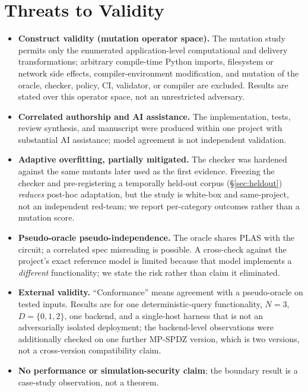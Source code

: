\documentclass[conference]{IEEEtran}
\begin{document}
\section{Threats to Validity}
\label{sec:threats}
\begin{itemize}[leftmargin=1.2em,itemsep=1pt]
\item \textbf{Construct validity (mutation operator space).} The mutation study permits only
the enumerated application-level computational and delivery transformations; arbitrary
compile-time Python imports, filesystem or network side effects, compiler-environment
modification, and mutation of the oracle, checker, policy, CI, validator, or compiler are
excluded. Results are stated over this operator space, not an unrestricted adversary.
\item \textbf{Correlated authorship and AI assistance.} The implementation, tests, review
synthesis, and manuscript were produced within one project with substantial AI assistance;
model agreement is not independent validation.
\item \textbf{Adaptive overfitting, partially mitigated.} The checker was hardened against
the same mutants later used as the first evidence. Freezing the checker and pre-registering a
temporally held-out corpus (\S\ref{sec:heldout}) \emph{reduces} post-hoc adaptation, but the
study is white-box and same-project, not an independent red-team; we report per-category
outcomes rather than a mutation score.
\item \textbf{Pseudo-oracle pseudo-independence.} The oracle shares PLAS with the circuit; a
correlated spec misreading is possible. A cross-check against the project's exact reference
model is limited because that model implements a \emph{different} functionality; we state the
risk rather than claim it eliminated.
\item \textbf{External validity.} ``Conformance'' means agreement with a pseudo-oracle on
tested inputs. Results are for one deterministic-query functionality, $N{=}3$,
$D{=}\{0,1,2\}$, one backend, and a single-host harness that is not an adversarially isolated
deployment; the backend-level observations were additionally checked on one further MP-SPDZ
version, which is two versions, not a cross-version compatibility claim.
\item \textbf{No performance or simulation-security claim}; the boundary result is a
case-study observation, not a theorem.
\end{itemize}

\end{document}
